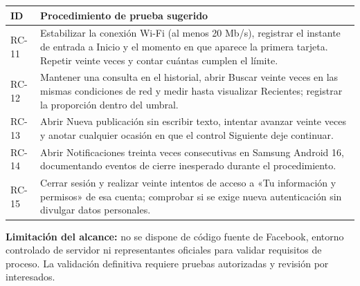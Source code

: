 \documentclass[11pt,a4paper]{article}
\begin{document}
{\small
\begin{tabularx}{\linewidth}{@{}p{1.5cm}X@{}}\toprule
\textbf{ID}&\textbf{Procedimiento de prueba sugerido}\\\midrule
RC-11 & Estabilizar la conexión Wi-Fi (al menos 20 Mb/s), registrar el instante de entrada a Inicio y el momento en que aparece la primera tarjeta. Repetir veinte veces y contar cuántas cumplen el límite.\\[3pt]
RC-12 & Mantener una consulta en el historial, abrir Buscar veinte veces en las mismas condiciones de red y medir hasta visualizar Recientes; registrar la proporción dentro del umbral.\\[3pt]
RC-13 & Abrir Nueva publicación sin escribir texto, intentar avanzar veinte veces y anotar cualquier ocasión en que el control Siguiente deje continuar.\\[3pt]
RC-14 & Abrir Notificaciones treinta veces consecutivas en Samsung Android 16, documentando eventos de cierre inesperado durante el procedimiento.\\[3pt]
RC-15 & Cerrar sesión y realizar veinte intentos de acceso a «Tu información y permisos» de esa cuenta; comprobar si se exige nueva autenticación sin divulgar datos personales.\\\bottomrule
\end{tabularx}}\par
\smallskip
\textbf{Limitación del alcance:} no se dispone de código fuente de Facebook, entorno controlado de servidor ni representantes oficiales para validar requisitos de proceso. La validación definitiva requiere pruebas autorizadas y revisión por interesados.

\vspace{-9pt}
{\footnotesize}
\end{document}
